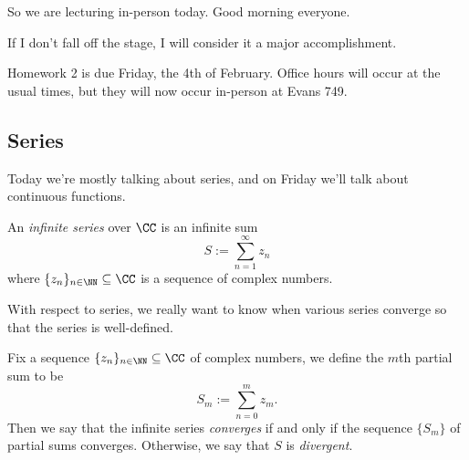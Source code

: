 
So we are lecturing in-person today. Good morning everyone.
\begin{quot}
	If I don't fall off the stage, I will consider it a major accomplishment.
\end{quot}
Homework 2 is due Friday, the 4th of February. Office hours will occur at the usual times, but they will now occur in-person at Evans 749.

\subsection{Series}
Today we're mostly talking about series, and on Friday we'll talk about continuous functions.
\begin{definition}[Series]
	An \textit{infinite series} over $\CC$ is an infinite sum
	\[S:=\sum_{n=1}^\infty z_n\]
	where $\{z_n\}_{n\in\NN}\subseteq\CC$ is a sequence of complex numbers.
\end{definition}
With respect to series, we really want to know when various series converge so that the series is well-defined.
\begin{definition}
	Fix a sequence $\{z_n\}_{n\in\NN}\subseteq\CC$ of complex numbers, we define the $m$th partial sum to be
	\[S_m:=\sum_{n=0}^mz_m.\]
	Then we say that the infinite series \textit{converges} if and only if the sequence $\{S_m\}$ of partial sums converges. Otherwise, we say that $S$ is \textit{divergent}.
\end{definition}

